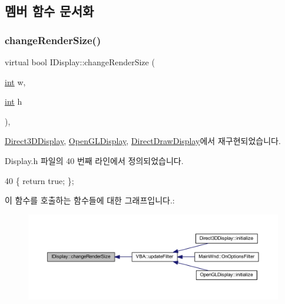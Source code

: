 \subsection{멤버 함수 문서화}
\mbox{\label{class_i_display_ab6e4355da026afb85710ae3e12329176}} 
\subsubsection{\texorpdfstring{change\+Render\+Size()}{changeRenderSize()}}
{\footnotesize\ttfamily virtual bool I\+Display\+::change\+Render\+Size (\begin{DoxyParamCaption}\item[{\mbox{\hyperlink{_util_8cpp_a0ef32aa8672df19503a49fab2d0c8071}{int}}}]{w,  }\item[{\mbox{\hyperlink{_util_8cpp_a0ef32aa8672df19503a49fab2d0c8071}{int}}}]{h }\end{DoxyParamCaption})\hspace{0.3cm}{\ttfamily [inline]}, {\ttfamily [virtual]}}



\mbox{\hyperlink{class_direct3_d_display_a74e1d9129809bda1014bac928cd0fe52}{Direct3\+D\+Display}}, \mbox{\hyperlink{class_open_g_l_display_aa0dc96c6070cadf3eb6e52875a72b449}{Open\+G\+L\+Display}}, \mbox{\hyperlink{class_direct_draw_display_a4e91a6dc8d9e32c8f26d11e3879bc850}{Direct\+Draw\+Display}}에서 재구현되었습니다.



Display.\+h 파일의 40 번째 라인에서 정의되었습니다.


\begin{DoxyCode}
40 \{ \textcolor{keywordflow}{return} \textcolor{keyword}{true}; \};
\end{DoxyCode}
이 함수를 호출하는 함수들에 대한 그래프입니다.\+:
\nopagebreak
\begin{figure}[H]
\begin{center}
\leavevmode
\includegraphics[width=350pt]{class_i_display_ab6e4355da026afb85710ae3e12329176_icgraph}
\end{center}
\end{figure}
\mbox{\label{class_i_display_afcb9df4a4949d13491f9a07a2ce24eb0}} 
